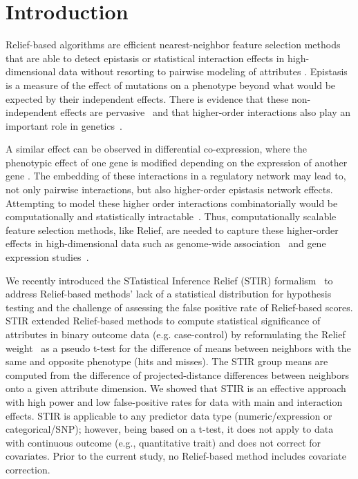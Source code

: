 \documentclass[10pt]{article}
\begin{document}

\linenumbers

\section{Introduction}

Relief-based algorithms are efficient nearest-neighbor feature selection methods that are able to detect epistasis or statistical interaction effects in high-dimensional data without resorting to pairwise modeling of attributes \cite{urbanowicz17b,kononenko97, mckinney09, rendell92}.
Epistasis is a measure of the effect of mutations on a phenotype beyond what would be expected by their independent effects. There is evidence that these non-independent effects are pervasive~\cite{breen12} and that higher-order interactions also play an important role in genetics~\cite{weinreich13}. 

A similar effect can be observed in differential co-expression, where the phenotypic effect of one gene is modified depending on the expression of another gene \cite{lareau15,diffcoexp10}.
The embedding of these interactions in a regulatory network may lead to, not only pairwise interactions, but also higher-order epistasis network effects. Attempting to model these higher order interactions combinatorially would be computationally and statistically intractable~\cite{riesselman18}.
Thus, computationally scalable feature selection methods, like Relief, are needed to capture these higher-order effects in high-dimensional data such as genome-wide association~\cite{titv} and gene expression studies~\cite{stir}.

We recently introduced the STatistical Inference Relief (STIR) formalism~\cite{stir} to address Relief-based methods' lack of a statistical distribution for hypothesis testing and the challenge of assessing the false positive rate of Relief-based scores.
STIR extended Relief-based methods to compute statistical significance of attributes in binary outcome data (e.g. case-control) by reformulating the Relief weight~\cite{mckinney13} as a pseudo t-test for the difference of means between neighbors with the same and opposite phenotype (hits and misses).
The STIR group means are computed from the difference of projected-distance differences between neighbors onto a given attribute dimension. We showed that STIR is an effective approach with high power and low false-positive rates for data with main and interaction effects. 
STIR is applicable to any predictor data type (numeric/expression or categorical/SNP); however, being based on a t-test, it does not apply to data with continuous outcome (e.g., quantitative trait) and does not correct for covariates.
Prior to the current study, no Relief-based method includes covariate correction.  
\end{document}
